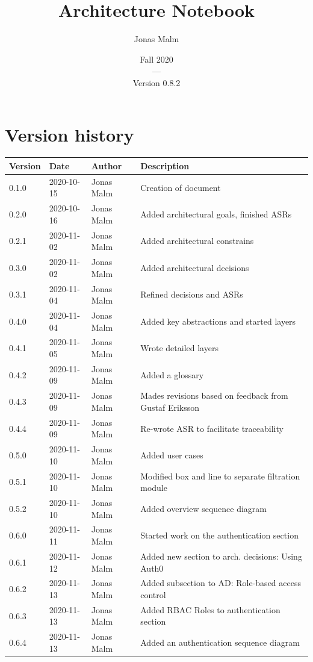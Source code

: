 \documentclass{article}
\title{Architecture Notebook}
\author{Jonas Malm}
\date{Fall 2020\\---\\Version 0.8.2}
\begin{document}
\maketitle
\clearpage

\begin{table}
\section*{Version history}
\centering
\begin{tabular}{|l|l|l|l|}
\hline
Version & Date & Author & Description \\ \hline
0.1.0 & 2020-10-15 & Jonas Malm & Creation of document\\ 
0.2.0 & 2020-10-16 & Jonas Malm & Added architectural goals, finished ASRs\\
0.2.1 & 2020-11-02 & Jonas Malm & Added architectural constrains\\ 
0.3.0 & 2020-11-02 & Jonas Malm & Added architectural decisions\\
0.3.1 & 2020-11-04 & Jonas Malm & Refined decisions and ASRs\\
0.4.0 & 2020-11-04 & Jonas Malm & Added key abstractions and started layers\\
0.4.1 & 2020-11-05 & Jonas Malm & Wrote detailed layers\\
0.4.2 & 2020-11-09 & Jonas Malm & Added a glossary\\
0.4.3 & 2020-11-09 & Jonas Malm & Mades revisions based on feedback from Gustaf Eriksson\\
0.4.4 & 2020-11-09 & Jonas Malm & Re-wrote ASR to facilitate traceability\\
0.5.0 & 2020-11-10 & Jonas Malm & Added user cases\\
0.5.1 & 2020-11-10 & Jonas Malm & Modified box and line to separate filtration module\\
0.5.2 & 2020-11-10 & Jonas Malm & Added overview sequence diagram\\
0.6.0 & 2020-11-11 & Jonas Malm & Started work on the authentication section\\
0.6.1 & 2020-11-12 & Jonas Malm & Added new section to arch. decisions: Using Auth0\\
0.6.2 & 2020-11-13 & Jonas Malm & Added subsection to AD: Role-based access control\\
0.6.3 & 2020-11-13 & Jonas Malm & Added RBAC Roles to authentication section\\
0.6.4 & 2020-11-13 & Jonas Malm & Added an authentication sequence diagram\\

\end{tabular}
\end{table}
\end{document}
